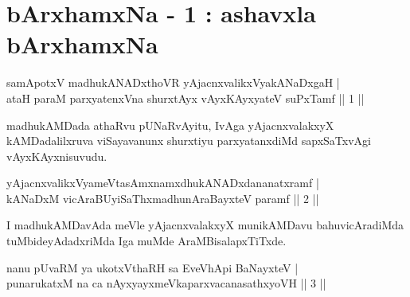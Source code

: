 
\chapter{bArxhamxNa - 1 : ashavxla bArxhamxNa}

\begin{shl}
samApotxV madhukANADxthoVR yAjacnxvalikxVyakANaDxgaH |\\
ataH paraM parxyatenxVna shurxtAyx vAyxKAyxyateV suPxTamf \hfill || 1 || 
\end{shl}

\begin{artha}
madhukAMDada athaRvu pUNaRvAyitu, IvAga yAjacnxvalakxyX kAMDadalilxruva viSayavanunx shurxtiyu parxyatanxdiMd sapxSaTxvAgi vAyxKAyxnisuvudu.
\end{artha}


\begin{shl}
yAjacnxvalikxVyameVtasAmxnamxdhukANADxdananatxramf |\\
kANaDxM vicAraBUyiSaThxmadhunA\s \s raBayxteV paramf \hfill || 2 ||
\end{shl}

\begin{artha}
I madhukAMDavAda meVle yAjacnxvalakxyX munikAMDavu bahuvicAradiMda tuMbideyAdadxriMda Iga muMde AraMBisalapxTiTxde.
\end{artha}



\begin{shl}
nanu pUvaRM ya ukotxV\s thaRH sa EveVhApi BaNayxteV |\\
punarukatxM na ca nAyxyayxmeVkaparxvacanasathxyoVH \hfill || 3 || 
\end{shl}

